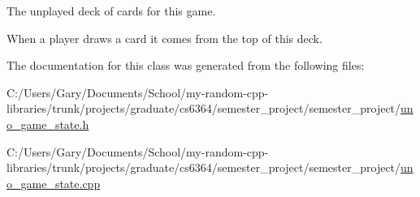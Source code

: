 \-The unplayed deck of cards for this game. 

\-When a player draws a card it comes from the top of this deck. 

\-The documentation for this class was generated from the following files\-:\begin{DoxyCompactItemize}
\item 
\-C\-:/\-Users/\-Gary/\-Documents/\-School/my-\/random-\/cpp-\/libraries/trunk/projects/graduate/cs6364/semester\-\_\-project/semester\-\_\-project/\hyperlink{uno__game__state_8h}{uno\-\_\-game\-\_\-state.\-h}\item 
\-C\-:/\-Users/\-Gary/\-Documents/\-School/my-\/random-\/cpp-\/libraries/trunk/projects/graduate/cs6364/semester\-\_\-project/semester\-\_\-project/\hyperlink{uno__game__state_8cpp}{uno\-\_\-game\-\_\-state.\-cpp}\end{DoxyCompactItemize}

